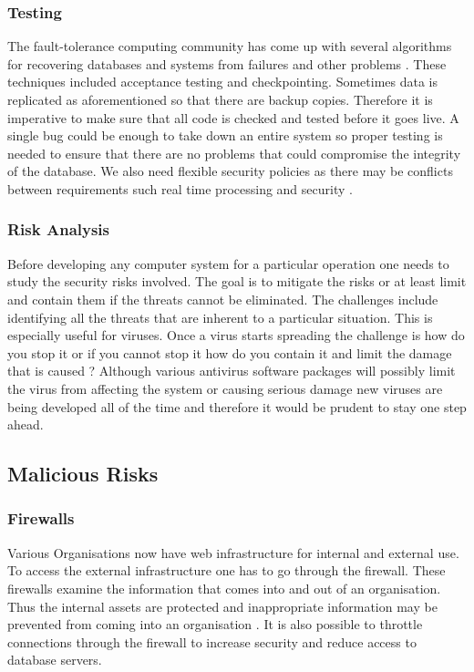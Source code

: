 \documentclass[11pt, twocolumn]{article}
\begin{document}
\subsubsection{Testing}
The fault-tolerance computing community has come up with several algorithms for recovering databases and systems from failures and other problems .  These techniques included acceptance testing and checkpointing\cite{Thur}.  Sometimes data is replicated as aforementioned so that there are backup copies.  Therefore it is imperative to make sure that all code is checked and tested before it goes live.  A single bug could be enough to take down an entire system so proper testing is needed to ensure that there are no problems that could compromise the integrity of the database.  We also need flexible security policies as there may be conflicts between requirements such real time processing and security \cite{Thur}.

\subsubsection{Risk Analysis}
Before developing any computer system for a particular operation one needs to study the security risks involved.  The goal is to mitigate the risks or at least limit and contain them if the threats cannot be eliminated.  The challenges include identifying all the threats that are inherent to a particular situation.  This is especially useful for viruses.  Once a virus starts spreading the challenge is how do you stop it or if you cannot stop it how do you contain it and limit the damage that is caused \cite{Thur}?  Although various antivirus software  packages will possibly limit the virus from affecting the system or causing serious damage new viruses are being developed all of the time and therefore it would be prudent to stay one step ahead.

\subsection{Malicious Risks}
\subsubsection{Firewalls}
Various Organisations now have web infrastructure for internal and external use.  To access the external infrastructure one has to go through the firewall.  These firewalls examine the information that comes into and out of an organisation.  Thus the internal assets are protected and inappropriate information may be prevented from coming into an organisation \cite{Thur}.  It is also possible to throttle connections through the firewall to increase security and reduce access to database servers.
\end{document}
